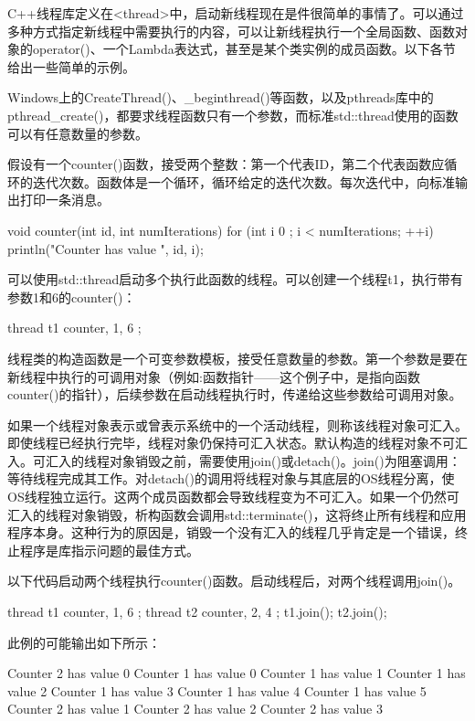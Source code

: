 
C++线程库定义在<thread>中，启动新线程现在是件很简单的事情了。可以通过多种方式指定新线程中需要执行的内容，可以让新线程执行一个全局函数、函数对象的operator()、一个Lambda表达式，甚至是某个类实例的成员函数。以下各节给出一些简单的示例。


Windows上的CreateThread()、\_beginthread()等函数，以及pthreads库中的pthread\_create()，都要求线程函数只有一个参数，而标准std::thread使用的函数可以有任意数量的参数。

假设有一个counter()函数，接受两个整数：第一个代表ID，第二个代表函数应循环的迭代次数。函数体是一个循环，循环给定的迭代次数。每次迭代中，向标准输出打印一条消息。

\begin{cpp}
void counter(int id, int numIterations)
{
    for (int i { 0 }; i < numIterations; ++i) {
        println("Counter {} has value {}", id, i);
    }
}
\end{cpp}

可以使用std::thread启动多个执行此函数的线程。可以创建一个线程t1，执行带有参数1和6的counter()：

\begin{cpp}
thread t1 { counter, 1, 6 };
\end{cpp}

线程类的构造函数是一个可变参数模板，接受任意数量的参数。第一个参数是要在新线程中执行的可调用对象（例如:函数指针——这个例子中，是指向函数counter()的指针），后续参数在启动线程执行时，传递给这些参数给可调用对象。

如果一个线程对象表示或曾表示系统中的一个活动线程，则称该线程对象可汇入。即使线程已经执行完毕，线程对象仍保持可汇入状态。默认构造的线程对象不可汇入。可汇入的线程对象销毁之前，需要使用join()或detach()。join()为阻塞调用：等待线程完成其工作。对detach()的调用将线程对象与其底层的OS线程分离，使OS线程独立运行。这两个成员函数都会导致线程变为不可汇入。如果一个仍然可汇入的线程对象销毁，析构函数会调用std::terminate()，这将终止所有线程和应用程序本身。这种行为的原因是，销毁一个没有汇入的线程几乎肯定是一个错误，终止程序是库指示问题的最佳方式。

以下代码启动两个线程执行counter()函数。启动线程后，对两个线程调用join()。

\begin{cpp}
thread t1 { counter, 1, 6 };
thread t2 { counter, 2, 4 };
t1.join();
t2.join();
\end{cpp}

此例的可能输出如下所示：

\begin{shell}
Counter 2 has value 0
Counter 1 has value 0
Counter 1 has value 1
Counter 1 has value 2
Counter 1 has value 3
Counter 1 has value 4
Counter 1 has value 5
Counter 2 has value 1
Counter 2 has value 2
Counter 2 has value 3
\end{shell}

